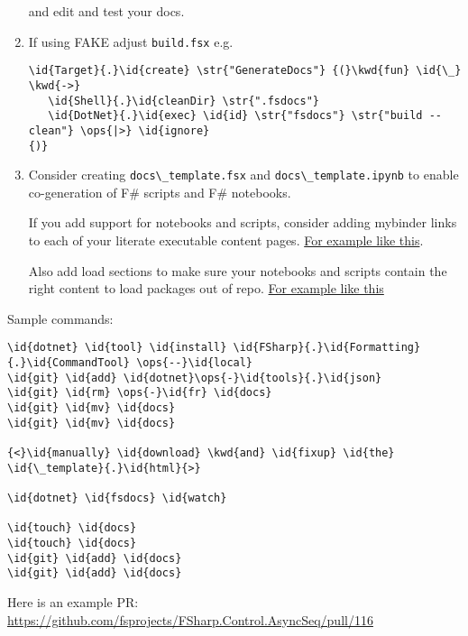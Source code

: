 \documentclass{article}
\newcommand{\id}[1]{\textcolor{black}{#1}}
\newcommand{\kwd}[1]{\textcolor{navy}{#1}}
\newcommand{\ops}[1]{\textcolor{purple}{#1}}
\newcommand{\str}[1]{\textcolor{olive}{#1}}
\begin{document}
\begin{enumerate}
and edit and test your docs.

\item 

If using FAKE adjust \texttt{build.fsx} e.g.
\begin{Verbatim}[commandchars=\\\{\}]
\id{Target}{.}\id{create} \str{"GenerateDocs"} {(}\kwd{fun} \id{\_} \kwd{->}
   \id{Shell}{.}\id{cleanDir} \str{".fsdocs"}
   \id{DotNet}{.}\id{exec} \id{id} \str{"fsdocs"} \str{"build --clean"} \ops{|>} \id{ignore}
{)}

\end{Verbatim}


\item 

Consider creating \texttt{docs{\textbackslash}\_template.fsx} and \texttt{docs{\textbackslash}\_template.ipynb} to enable co-generation of F\# scripts and F\# notebooks.


If you add support for notebooks and scripts, consider adding mybinder links to each of your literate executable content pages. \href{https://github.com/fsprojects/FSharp.Formatting/blob/master/docs/literate.fsx\#L19}{For example like this}.


Also add load sections to make sure your notebooks and scripts contain the right content to load packages out of repo.  \href{https://github.com/fsprojects/FSharp.Formatting/blob/master/docs/literate.fsx\#L1}{For example like this}

\end{enumerate}



Sample commands:
\begin{Verbatim}[commandchars=\\\{\}]
\id{dotnet} \id{tool} \id{install} \id{FSharp}{.}\id{Formatting}{.}\id{CommandTool} \ops{--}\id{local}
\id{git} \id{add} \id{dotnet}\ops{-}\id{tools}{.}\id{json}   
\id{git} \id{rm} \ops{-}\id{fr} \id{docs}
\id{git} \id{mv} \id{docs}
\id{git} \id{mv} \id{docs}

{<}\id{manually} \id{download} \kwd{and} \id{fixup} \id{the} \id{\_template}{.}\id{html}{>}

\id{dotnet} \id{fsdocs} \id{watch}

\id{touch} \id{docs}
\id{touch} \id{docs}
\id{git} \id{add} \id{docs}
\id{git} \id{add} \id{docs}

\end{Verbatim}



Here is an example PR: \href{https://github.com/fsprojects/FSharp.Control.AsyncSeq/pull/116}{https://github.com/fsprojects/FSharp.Control.AsyncSeq/pull/116}
\end{document}
